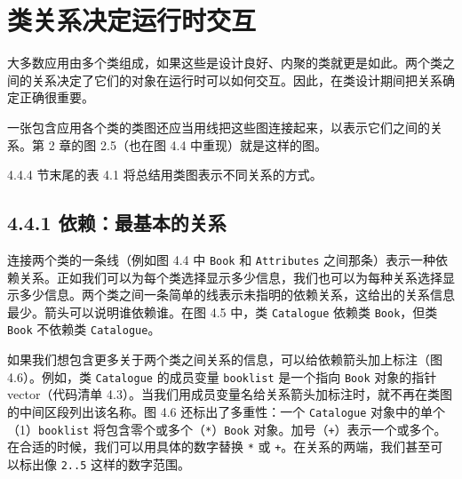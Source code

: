 \section{类关系决定运行时交互}

大多数应用由多个类组成，如果这些是设计良好、内聚的类就更是如此。两个类之间的关系决定了它们的对象在运行时可以如何交互。因此，在类设计期间把关系确定正确很重要。

一张包含应用各个类的类图还应当用线把这些图连接起来，以表示它们之间的关系。第 2 章的图 2.5（也在图 4.4 中重现）就是这样的图。


4.4.4 节末尾的表 4.1 将总结用类图表示不同关系的方式。

\subsection{4.4.1 依赖：最基本的关系}

连接两个类的一条线（例如图 4.4 中 \texttt{Book} 和 \texttt{Attributes} 之间那条）表示一种依赖关系。正如我们可以为每个类选择显示多少信息，我们也可以为每种关系选择显示多少信息。两个类之间一条简单的线表示未指明的依赖关系，这给出的关系信息最少。箭头可以说明谁依赖谁。在图 4.5 中，类 \texttt{Catalogue} 依赖类 \texttt{Book}，但类 \texttt{Book} 不依赖类 \texttt{Catalogue}。


如果我们想包含更多关于两个类之间关系的信息，可以给依赖箭头加上标注（图 4.6）。例如，类 \texttt{Catalogue} 的成员变量 \texttt{booklist} 是一个指向 \texttt{Book} 对象的指针 vector（代码清单 4.3）。当我们用成员变量名给关系箭头加标注时，就不再在类图的中间区段列出该名称。图 4.6 还标出了多重性：一个 \texttt{Catalogue} 对象中的单个（1）\texttt{booklist} 将包含零个或多个（\texttt{*}）\texttt{Book} 对象。加号（\texttt{+}）表示一个或多个。在合适的时候，我们可以用具体的数字替换 \texttt{*} 或 \texttt{+}。在关系的两端，我们甚至可以标出像 \texttt{2..5} 这样的数字范围。


